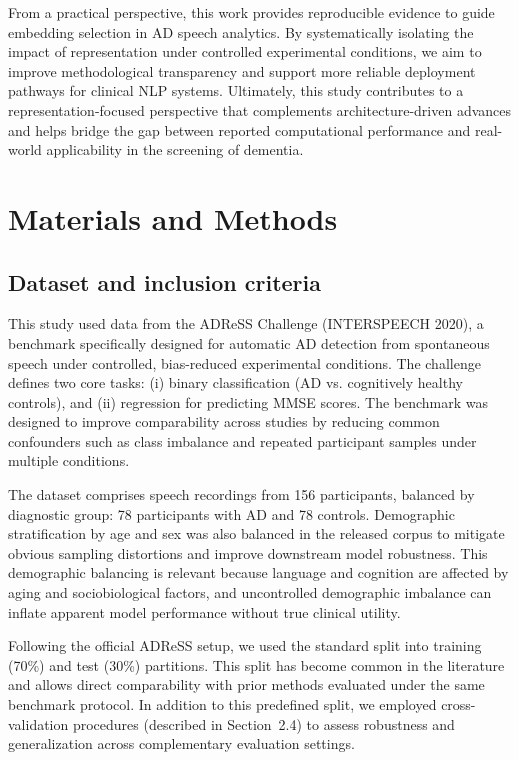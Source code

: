 \documentclass[final,5p,times]{elsarticle}
\begin{document}
From a practical perspective, this work provides reproducible evidence to guide embedding selection in AD speech analytics. By systematically isolating the impact of representation under controlled experimental conditions, we aim to improve methodological transparency and support more reliable deployment pathways for clinical NLP systems. Ultimately, this study contributes to a representation-focused perspective that complements architecture-driven advances and helps bridge the gap between reported computational performance and real-world applicability in the screening of dementia.


\section{Materials and Methods}

\subsection{Dataset and inclusion criteria}

This study used data from the ADReSS Challenge (INTERSPEECH 2020), a benchmark specifically designed for automatic AD detection from spontaneous speech under controlled, bias-reduced experimental conditions. The challenge defines two core tasks: (i) binary classification (AD vs. cognitively healthy controls), and (ii) regression for predicting MMSE scores. The benchmark was designed to improve comparability across studies by reducing common confounders such as class imbalance and repeated participant samples under multiple conditions.

The dataset comprises speech recordings from 156 participants, balanced by diagnostic group: 78 participants with AD and 78 controls. Demographic stratification by age and sex was also balanced in the released corpus to mitigate obvious sampling distortions and improve downstream model robustness. This demographic balancing is relevant because language and cognition are affected by aging and sociobiological factors, and uncontrolled demographic imbalance can inflate apparent model performance without true clinical utility.

Following the official ADReSS setup, we used the standard split into training (70\%) and test (30\%) partitions. This split has become common in the literature and allows direct comparability with prior methods evaluated under the same benchmark protocol. In addition to this predefined split, we employed cross-validation procedures (described in Section~2.4) to assess robustness and generalization across complementary evaluation settings.
\end{document}
